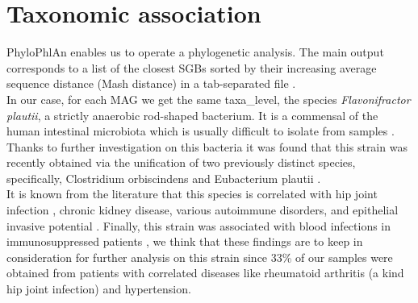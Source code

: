 \documentclass[a4paper,titlepage, oneside]{book}
\newcommand{\code}[1]{\colorbox{light-gray}{\texttt{#1}}}
\begin{document}
\section{Taxonomic association}
PhyloPhlAn enables us to operate a phylogenetic analysis. The main output corresponds to a list of the closest SGBs sorted by their increasing average sequence distance (Mash distance) in a tab-separated file \cite{PhyloGuide}. 
\\In our case, for each MAG we get the same taxa\_level, the species \textit{Flavonifractor plautii}, a strictly anaerobic rod-shaped bacterium. It is a commensal of the human intestinal microbiota which is  usually difficult to isolate from samples \cite{Plauti}.
\\Thanks to further investigation on this bacteria it was found that this strain was recently obtained via the unification of two previously distinct species, specifically, Clostridium orbiscindens and Eubacterium plautii \cite{Unification}.
\\It is known from the literature that this species is correlated with hip joint infection \cite{HipJoint}, chronic kidney disease, various autoimmune disorders, and epithelial invasive potential \cite{PlautiiDiseases}. Finally, this strain was associated with blood infections in immunosuppressed patients \cite{PlautiiBlood},
we think that these findings are to keep in consideration for further analysis on this strain since 33\% of our samples were obtained from patients with correlated diseases like rheumatoid arthritis (a kind hip joint infection) and hypertension.
\end{document}
